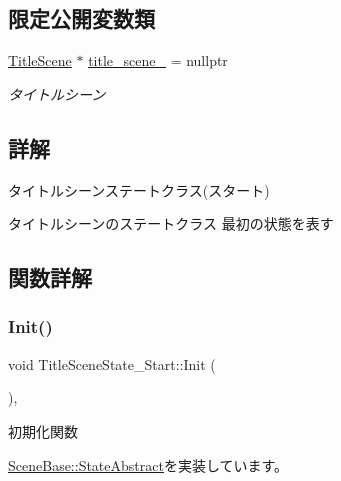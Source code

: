 \subsection*{限定公開変数類}
\begin{DoxyCompactItemize}
\item 
\mbox{\hyperlink{class_title_scene}{Title\+Scene}} $\ast$ \mbox{\hyperlink{class_title_scene_state___start_a1a0dde9e9834cb18e0cf1e1ab12a2129}{title\+\_\+scene\+\_\+}} = nullptr
\begin{DoxyCompactList}\small\item\em タイトルシーン \end{DoxyCompactList}\end{DoxyCompactItemize}


\subsection{詳解}
タイトルシーンステートクラス(スタート) 

タイトルシーンのステートクラス 最初の状態を表す 

\subsection{関数詳解}
\mbox{\label{class_title_scene_state___start_a3e785ba088ac3fd0989fd657e5d0cd34}} 
\subsubsection{\texorpdfstring{Init()}{Init()}}
{\footnotesize\ttfamily void Title\+Scene\+State\+\_\+\+Start\+::\+Init (\begin{DoxyParamCaption}{ }\end{DoxyParamCaption})\hspace{0.3cm}{\ttfamily [override]}, {\ttfamily [virtual]}}



初期化関数 



\mbox{\hyperlink{class_scene_base_1_1_state_abstract_a2f5ea12e789aa52df179e6df469b870d}{Scene\+Base\+::\+State\+Abstract}}を実装しています。

\mbox{\label{class_title_scene_state___start_af4dfe902a4391ca8f0cff5d1aa9507f8}} 
